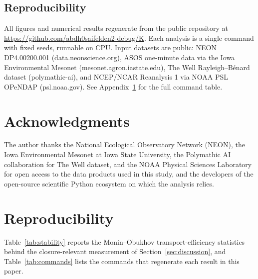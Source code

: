 \documentclass[11pt]{article}
\begin{document}
\subsection{Reproducibility}

All figures and numerical results regenerate from the public repository at
\url{https://github.com/abdh0saifelden2-debug/K}. Each analysis is a single
command with fixed seeds, runnable on CPU. Input datasets are public: NEON
DP4.00200.001 (data.neonscience.org), ASOS one-minute data via the Iowa
Environmental Mesonet (mesonet.agron.iastate.edu), The Well Rayleigh--B\'enard
dataset (polymathic-ai), and NCEP/NCAR Reanalysis 1 via NOAA PSL OPeNDAP
(psl.noaa.gov). See Appendix~\ref{app:reproducibility} for the full command table.

\section*{Acknowledgments}

The author thanks the National Ecological Observatory Network (NEON), the Iowa
Environmental Mesonet at Iowa State University, the Polymathic AI collaboration
for The Well dataset, and the NOAA Physical Sciences Laboratory for open access
to the data products used in this study, and the developers of the open-source
scientific Python ecosystem on which the analysis relies.

\appendix

\section{Reproducibility}
\label{app:reproducibility}

Table~\ref{tab:stability} reports the Monin--Obukhov transport-efficiency
statistics behind the closure-relevant measurement of
Section~\ref{sec:discussion}, and Table~\ref{tab:commands} lists the commands
that regenerate each result in this paper.
\end{document}
